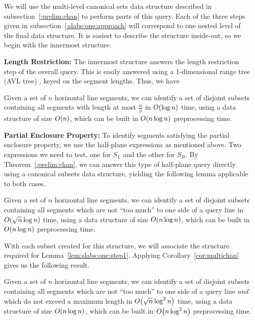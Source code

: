 We will use the multi-level canonical sets data structure described in subsection~\ref{:prelim:chan} to perform parts of this query.
Each of the three steps given in subsection~\ref{:slabs:one:approach} will correspond to one nested level of the final data structure.
It is easiest to describe the structure inside-out, so we begin with the innermost structure.


{\bf Length Restriction:}
The innermost structure answers the length restriction step of the overall query. 
This is easily answered using a 1-dimensional range tree (AVL tree) \cite{Deberg}, 
keyed on the segment lengths. Thus, we have

\begin{lemma}
\label{lem:slabs:one:step1}
Given a set of $n$ horizontal line segments, we can identify a set of disjoint subsets containing all segments with length at most $\frac{w}{\rho}$ in $O\!\left(\log{n}\right)$ time, using a data structure of size $O\!\left(n\right)$, which can be built in $O\!\left(n \log{n}\right)$ preprocessing time.
\end{lemma}


{\bf Partial Enclosure Property:}
To identify segments satisfying the partial enclosure property, we use the half-plane expressions as mentioned above. 
Two expressions we need to test, one for $S_L$ and the other for $S_R$. 
By Theorem~\ref{:prelim:chan}, we can answer this type of half-plane query directly using a canonical subsets data structure, yielding the following lemma applicable to both cases.

\begin{lemma}
\label{lem:slabs:one:step2a}
Given a set of $n$ horizontal line segments, we can identify a set of disjoint subsets containing all segments which are not ``too much'' to one side of a query line in $O\!\left(\sqrt{n}\log{n}\right)$ time, using a data structure of size $O\!\left(n\log{n}\right)$, which can be built in $O\!\left(n\log{n}\right)$ preprocessing time.
\end{lemma}

With each subset created for this structure, we will associate the structure required for Lemma~\ref{lem:slabs:one:step1}.
Applying Corollary~\ref{cor:multichan} gives us the following result.

\begin{lemma}
\label{lem:slabs:one:step2b}
Given a set of $n$ horizontal line segments, we can identify a set of disjoint subsets containing all segments which are not ``too much'' to one side of a query line \emph{and} which do not exceed a maximum length in $O\!\left(\sqrt{n}\log^2{n}\right)$ time, using a data structure of size $O\!\left(n\log{n}\right)$, which can be built in $O\!\left(n\log^2{n}\right)$ preprocessing time.
\end{lemma}


